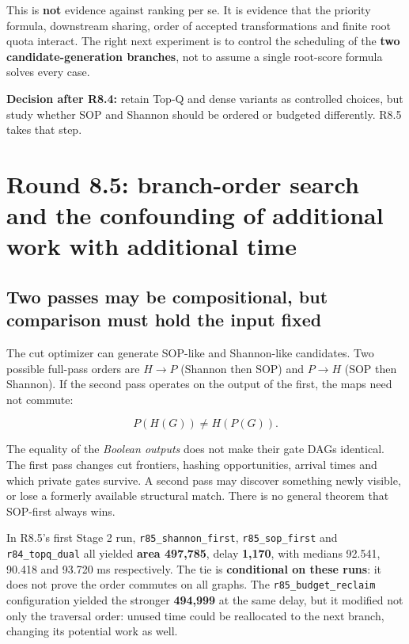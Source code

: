 This is \textbf{not} evidence against ranking per se. It is evidence that the priority formula, downstream sharing, order of accepted transformations and finite root quota interact. The right next experiment is to control the scheduling of the \textbf{two candidate-generation branches}, not to assume a single root-score formula solves every case.

\begin{tcolorbox}[colback=ResearchBlue!6!white,colframe=ResearchSlate!55!white,boxrule=0.65pt,arc=1mm,breakable]
\textbf{Decision after R8.4:} retain Top-Q and dense variants as controlled choices, but study whether SOP and Shannon should be ordered or budgeted differently. R8.5 takes that step.
\end{tcolorbox}

\section{Round 8.5: branch-order search and the confounding of additional work with additional time}\label{round-8.5-branch-order-search-and-the-confounding-of-additional-work-with-additional-time}

\subsection{Two passes may be compositional, but comparison must hold the input fixed}\label{two-passes-may-be-compositional-but-comparison-must-hold-the-input-fixed}

The cut optimizer can generate SOP-like and Shannon-like candidates. Two possible full-pass orders are \(H\rightarrow P\) (Shannon then SOP) and \(P\rightarrow H\) (SOP then Shannon). If the second pass operates on the output of the first, the maps need not commute:

\[
P(H(G))\ne H(P(G)).
\]

The equality of the \emph{Boolean outputs} does not make their gate DAGs identical. The first pass changes cut frontiers, hashing opportunities, arrival times and which private gates survive. A second pass may discover something newly visible, or lose a formerly available structural match. There is no general theorem that SOP-first always wins.

In R8.5's first Stage 2 run, \texttt{r85\_shannon\_first}, \texttt{r85\_sop\_first} and \texttt{r84\_topq\_dual} all yielded \textbf{area 497,785}, delay \textbf{1,170}, with medians 92.541, 90.418 and 93.720 ms respectively. The tie is \textbf{conditional on these runs}: it does not prove the order commutes on all graphs. The \texttt{r85\_budget\_reclaim} configuration yielded the stronger \textbf{494,999} at the same delay, but it modified not only the traversal order: unused time could be reallocated to the next branch, changing its potential work as well.

